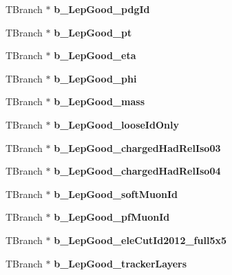 \begin{DoxyCompactItemize}
T\+Branch $\ast$ {\bfseries b\+\_\+\+Lep\+Good\+\_\+pdg\+Id}
\item 
\hypertarget{classMiniTree_aa98caaf42c913a9031123f051b0a8444}{}\label{classMiniTree_aa98caaf42c913a9031123f051b0a8444} 
T\+Branch $\ast$ {\bfseries b\+\_\+\+Lep\+Good\+\_\+pt}
\item 
\hypertarget{classMiniTree_a3bc3da99831e1362664ce5e0e059c0c7}{}\label{classMiniTree_a3bc3da99831e1362664ce5e0e059c0c7} 
T\+Branch $\ast$ {\bfseries b\+\_\+\+Lep\+Good\+\_\+eta}
\item 
\hypertarget{classMiniTree_a07760a3699414ace6e069e8af96a2137}{}\label{classMiniTree_a07760a3699414ace6e069e8af96a2137} 
T\+Branch $\ast$ {\bfseries b\+\_\+\+Lep\+Good\+\_\+phi}
\item 
\hypertarget{classMiniTree_a053cb22262f6e3525804a49b6261ba3e}{}\label{classMiniTree_a053cb22262f6e3525804a49b6261ba3e} 
T\+Branch $\ast$ {\bfseries b\+\_\+\+Lep\+Good\+\_\+mass}
\item 
\hypertarget{classMiniTree_a8c3a806c35f908ad0f8be35d6e5329be}{}\label{classMiniTree_a8c3a806c35f908ad0f8be35d6e5329be} 
T\+Branch $\ast$ {\bfseries b\+\_\+\+Lep\+Good\+\_\+loose\+Id\+Only}
\item 
\hypertarget{classMiniTree_a1b9a2bf5fa2b0a69ab8ed3ead619cc90}{}\label{classMiniTree_a1b9a2bf5fa2b0a69ab8ed3ead619cc90} 
T\+Branch $\ast$ {\bfseries b\+\_\+\+Lep\+Good\+\_\+charged\+Had\+Rel\+Iso03}
\item 
\hypertarget{classMiniTree_a522e697108b7b8802f18e26b4e4fc35d}{}\label{classMiniTree_a522e697108b7b8802f18e26b4e4fc35d} 
T\+Branch $\ast$ {\bfseries b\+\_\+\+Lep\+Good\+\_\+charged\+Had\+Rel\+Iso04}
\item 
\hypertarget{classMiniTree_a6de5f2710e6b35fb0a07b47fa27c935c}{}\label{classMiniTree_a6de5f2710e6b35fb0a07b47fa27c935c} 
T\+Branch $\ast$ {\bfseries b\+\_\+\+Lep\+Good\+\_\+soft\+Muon\+Id}
\item 
\hypertarget{classMiniTree_acc36063aacce4d8a47e99cb12595f4f8}{}\label{classMiniTree_acc36063aacce4d8a47e99cb12595f4f8} 
T\+Branch $\ast$ {\bfseries b\+\_\+\+Lep\+Good\+\_\+pf\+Muon\+Id}
\item 
\hypertarget{classMiniTree_a782695c2e2d3bba6fd347db259f9b542}{}\label{classMiniTree_a782695c2e2d3bba6fd347db259f9b542} 
T\+Branch $\ast$ {\bfseries b\+\_\+\+Lep\+Good\+\_\+ele\+Cut\+Id2012\+\_\+full5x5}
\item 
\hypertarget{classMiniTree_a67d22a73e5d6e266990f594b983c4318}{}\label{classMiniTree_a67d22a73e5d6e266990f594b983c4318} 
T\+Branch $\ast$ {\bfseries b\+\_\+\+Lep\+Good\+\_\+tracker\+Layers}

\end{DoxyCompactItemize}
